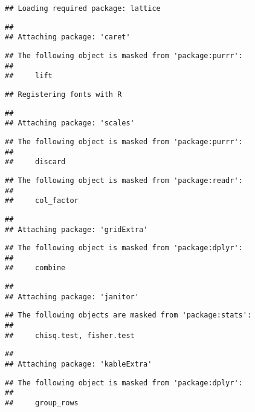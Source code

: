 \documentclass[]{article}
\begin{document}
\begin{verbatim}
## Loading required package: lattice
\end{verbatim}

\begin{verbatim}
## 
## Attaching package: 'caret'
\end{verbatim}

\begin{verbatim}
## The following object is masked from 'package:purrr':
## 
##     lift
\end{verbatim}

\begin{verbatim}
## Registering fonts with R
\end{verbatim}

\begin{verbatim}
## 
## Attaching package: 'scales'
\end{verbatim}

\begin{verbatim}
## The following object is masked from 'package:purrr':
## 
##     discard
\end{verbatim}

\begin{verbatim}
## The following object is masked from 'package:readr':
## 
##     col_factor
\end{verbatim}

\begin{verbatim}
## 
## Attaching package: 'gridExtra'
\end{verbatim}

\begin{verbatim}
## The following object is masked from 'package:dplyr':
## 
##     combine
\end{verbatim}

\begin{verbatim}
## 
## Attaching package: 'janitor'
\end{verbatim}

\begin{verbatim}
## The following objects are masked from 'package:stats':
## 
##     chisq.test, fisher.test
\end{verbatim}

\begin{verbatim}
## 
## Attaching package: 'kableExtra'
\end{verbatim}

\begin{verbatim}
## The following object is masked from 'package:dplyr':
## 
##     group_rows
\end{verbatim}
\end{document}
